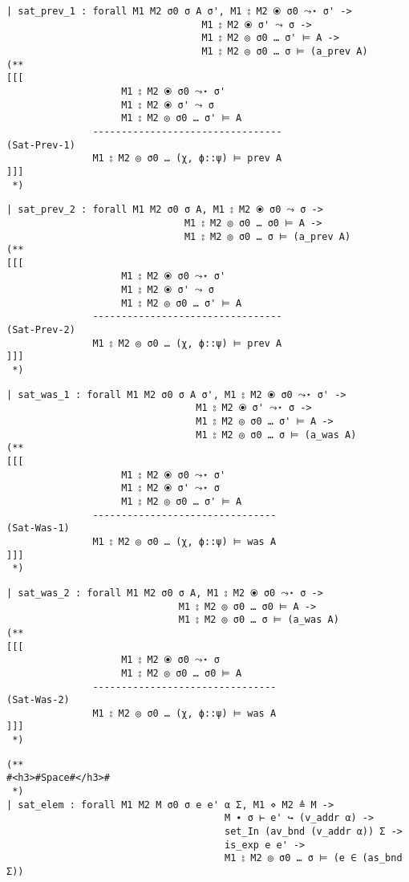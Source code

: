 \documentclass[12pt]{article}
\begin{document}
\begin{verbatim}
| sat_prev_1 : forall M1 M2 σ0 σ A σ', M1 ⦂ M2 ⦿ σ0 ⤳⋆ σ' ->
                                  M1 ⦂ M2 ⦿ σ' ⤳ σ ->
                                  M1 ⦂ M2 ◎ σ0 … σ' ⊨ A ->
                                  M1 ⦂ M2 ◎ σ0 … σ ⊨ (a_prev A)
(**
[[[
                    M1 ⦂ M2 ⦿ σ0 ⤳⋆ σ'
                    M1 ⦂ M2 ⦿ σ' ⤳ σ
                    M1 ⦂ M2 ◎ σ0 … σ' ⊨ A
               ---------------------------------                   (Sat-Prev-1)
               M1 ⦂ M2 ◎ σ0 … (χ, ϕ::ψ) ⊨ prev A
]]]
 *)
\end{verbatim}
\begin{verbatim}
| sat_prev_2 : forall M1 M2 σ0 σ A, M1 ⦂ M2 ⦿ σ0 ⤳ σ ->
                               M1 ⦂ M2 ◎ σ0 … σ0 ⊨ A ->
                               M1 ⦂ M2 ◎ σ0 … σ ⊨ (a_prev A)
(**
[[[
                    M1 ⦂ M2 ⦿ σ0 ⤳⋆ σ'
                    M1 ⦂ M2 ⦿ σ' ⤳ σ
                    M1 ⦂ M2 ◎ σ0 … σ' ⊨ A
               ---------------------------------                   (Sat-Prev-2)
               M1 ⦂ M2 ◎ σ0 … (χ, ϕ::ψ) ⊨ prev A
]]]
 *)
\end{verbatim}
\begin{verbatim}
| sat_was_1 : forall M1 M2 σ0 σ A σ', M1 ⦂ M2 ⦿ σ0 ⤳⋆ σ' ->
                                 M1 ⦂ M2 ⦿ σ' ⤳⋆ σ ->
                                 M1 ⦂ M2 ◎ σ0 … σ' ⊨ A ->
                                 M1 ⦂ M2 ◎ σ0 … σ ⊨ (a_was A)
(**
[[[
                    M1 ⦂ M2 ⦿ σ0 ⤳⋆ σ'
                    M1 ⦂ M2 ⦿ σ' ⤳⋆ σ
                    M1 ⦂ M2 ◎ σ0 … σ' ⊨ A
               --------------------------------                   (Sat-Was-1)
               M1 ⦂ M2 ◎ σ0 … (χ, ϕ::ψ) ⊨ was A
]]]
 *)
\end{verbatim}
\begin{verbatim}
| sat_was_2 : forall M1 M2 σ0 σ A, M1 ⦂ M2 ⦿ σ0 ⤳⋆ σ ->
                              M1 ⦂ M2 ◎ σ0 … σ0 ⊨ A ->
                              M1 ⦂ M2 ◎ σ0 … σ ⊨ (a_was A)
(**
[[[
                    M1 ⦂ M2 ⦿ σ0 ⤳⋆ σ
                    M1 ⦂ M2 ◎ σ0 … σ0 ⊨ A
               --------------------------------                   (Sat-Was-2)
               M1 ⦂ M2 ◎ σ0 … (χ, ϕ::ψ) ⊨ was A
]]]
 *)
\end{verbatim}
\begin{verbatim}
(**
#<h3>#Space#</h3>#
 *)
| sat_elem : forall M1 M2 M σ0 σ e e' α Σ, M1 ⋄ M2 ≜ M ->
                                      M ∙ σ ⊢ e' ↪ (v_addr α) ->
                                      set_In (av_bnd (v_addr α)) Σ ->
                                      is_exp e e' ->
                                      M1 ⦂ M2 ◎ σ0 … σ ⊨ (e ∈ (as_bnd Σ))
\end{verbatim}
\end{document}

